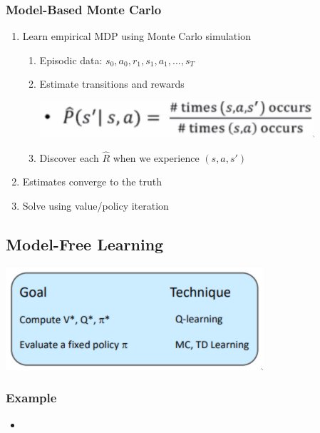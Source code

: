 \documentclass[11pt]{article}
\begin{document}
\subsubsection{Model-Based Monte Carlo}
\label{sec:org4db55e8}
\begin{enumerate}
\item Learn empirical MDP using Monte Carlo simulation
\begin{enumerate}
\item Episodic data: \(s_0, a_0, r_1, s_1, a_1, ..., s_T\)
\item Estimate transitions and rewards
\begin{center}
\includegraphics[width=.9\linewidth]{images/2020-09-15_17-19-38_screenshot.png}
\end{center}
\item Discover each \(\hat{R}\) when we experience \((s, a, s')\)
\end{enumerate}
\item Estimates converge to the truth
\item Solve using value/policy iteration
\end{enumerate}
\subsection{Model-Free Learning}
\label{sec:orgb6e401d}
\begin{center}
\includegraphics[width=.9\linewidth]{images/2020-09-17_17-14-56_screenshot.png}
\end{center}

\subsubsection{Example}
\label{sec:orgabac939}
\begin{itemize}
\item 
\end{itemize}
\end{document}
